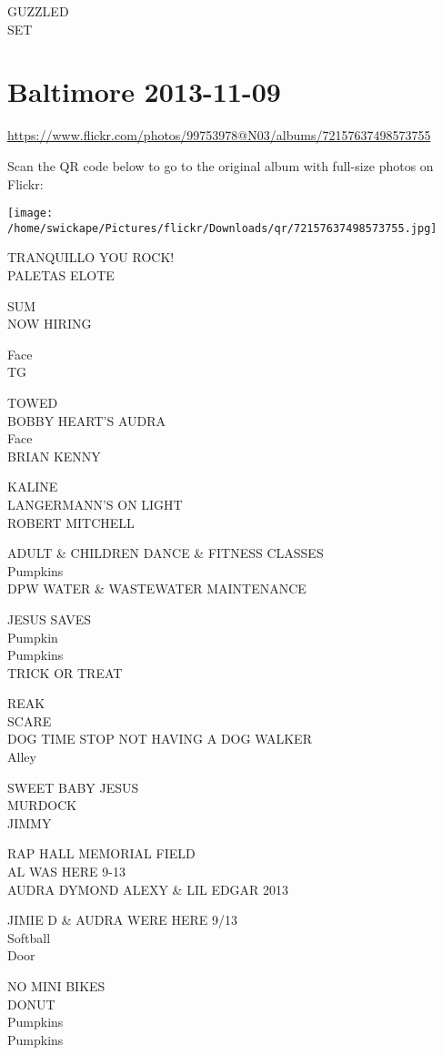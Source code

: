 \documentclass[10pt,letterpaper]{article}
\begin{document}
GUZZLED\\
SET


\section*{Baltimore 2013-11-09}

\url{https://www.flickr.com/photos/99753978@N03/albums/72157637498573755}

Scan the QR code below to go to the original album with full-size photos on Flickr:

\texttt{[image: /home/swickape/Pictures/flickr/Downloads/qr/72157637498573755.jpg]}


TRANQUILLO YOU ROCK!\\
PALETAS ELOTE

SUM\\
NOW HIRING

Face\\
TG

TOWED\\
BOBBY HEART'S AUDRA\\
Face\\
BRIAN KENNY

KALINE\\
LANGERMANN'S ON LIGHT\\
ROBERT MITCHELL

ADULT \& CHILDREN DANCE \& FITNESS CLASSES\\
Pumpkins\\
DPW WATER \& WASTEWATER MAINTENANCE

JESUS SAVES\\
Pumpkin\\
Pumpkins\\
TRICK OR TREAT

REAK\\
SCARE\\
DOG TIME STOP NOT HAVING A DOG WALKER\\
Alley

SWEET BABY JESUS\\
MURDOCK\\
JIMMY

RAP HALL MEMORIAL FIELD\\
AL WAS HERE 9{-}13\\
AUDRA DYMOND ALEXY \& LIL EDGAR 2013

JIMIE D \& AUDRA WERE HERE 9/13\\
Softball\\
Door

NO MINI BIKES\\
DONUT\\
Pumpkins\\
Pumpkins
\end{document}
